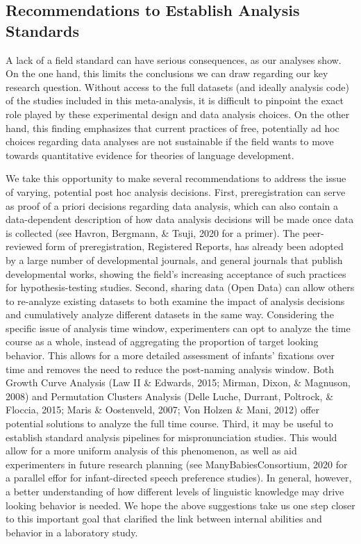 \documentclass[man]{apa6}
\begin{document}
\hypertarget{recommendations-to-establish-analysis-standards}{%
\subsection{Recommendations to Establish Analysis Standards}\label{recommendations-to-establish-analysis-standards}}

A lack of a field standard can have serious consequences, as our analyses show. On the one hand, this limits the conclusions we can draw regarding our key research question. Without access to the full datasets (and ideally analysis code) of the studies included in this meta-analysis, it is difficult to pinpoint the exact role played by these experimental design and data analysis choices. On the other hand, this finding emphasizes that current practices of free, potentially ad hoc choices regarding data analyses are not sustainable if the field wants to move towards quantitative evidence for theories of language development.

We take this opportunity to make several recommendations to address the issue of varying, potential post hoc analysis decisions. First, preregistration can serve as proof of a priori decisions regarding data analysis, which can also contain a data-dependent description of how data analysis decisions will be made once data is collected (see Havron, Bergmann, \& Tsuji, 2020 for a primer). The peer-reviewed form of preregistration, Registered Reports, has already been adopted by a large number of developmental journals, and general journals that publish developmental works, showing the field's increasing acceptance of such practices for hypothesis-testing studies. Second, sharing data (Open Data) can allow others to re-analyze existing datasets to both examine the impact of analysis decisions and cumulatively analyze different datasets in the same way. Considering the specific issue of analysis time window, experimenters can opt to analyze the time course as a whole, instead of aggregating the proportion of target looking behavior. This allows for a more detailed assessment of infants' fixations over time and removes the need to reduce the post-naming analysis window. Both Growth Curve Analysis (Law II \& Edwards, 2015; Mirman, Dixon, \& Magnuson, 2008) and Permutation Clusters Analysis (Delle Luche, Durrant, Poltrock, \& Floccia, 2015; Maris \& Oostenveld, 2007; Von Holzen \& Mani, 2012) offer potential solutions to analyze the full time course. Third, it may be useful to establish standard analysis pipelines for mispronunciation studies. This would allow for a more uniform analysis of this phenomenon, as well as aid experimenters in future research planning (see ManyBabiesConsortium, 2020 for a parallel effor for infant-directed speech preference studies). In general, however, a better understanding of how different levels of linguistic knowledge may drive looking behavior is needed. We hope the above suggestions take us one step closer to this important goal that clarified the link between internal abilities and behavior in a laboratory study.
\end{document}
